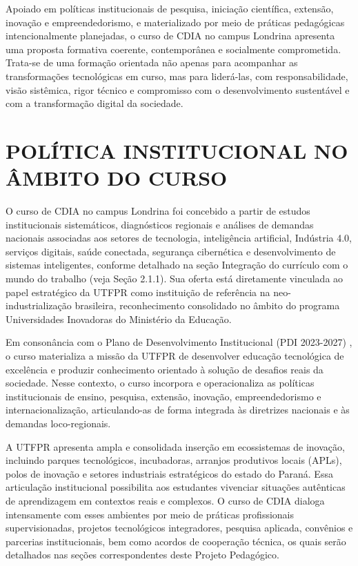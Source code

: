 Apoiado em políticas institucionais de pesquisa, iniciação científica, extensão, inovação e empreendedorismo, e materializado por meio de práticas pedagógicas intencionalmente planejadas, o curso de CDIA no campus Londrina apresenta uma proposta formativa coerente, contemporânea e socialmente comprometida. Trata-se de uma formação orientada não apenas para acompanhar as transformações tecnológicas em curso, mas para liderá-las, com responsabilidade, visão sistêmica, rigor técnico e compromisso com o desenvolvimento sustentável e com a transformação digital da sociedade.

\section{POLÍTICA INSTITUCIONAL NO ÂMBITO DO CURSO}

O curso de CDIA no campus Londrina foi concebido a partir de estudos institucionais sistemáticos, diagnósticos regionais e análises de demandas nacionais associadas aos setores de tecnologia, inteligência artificial, Indústria 4.0, serviços digitais, saúde conectada, segurança cibernética e desenvolvimento de sistemas inteligentes, conforme detalhado na seção Integração do currículo com o mundo do trabalho (veja Seção 2.1.1). Sua oferta está diretamente vinculada ao papel estratégico da UTFPR como instituição de referência na neo-industrialização brasileira, reconhecimento consolidado no âmbito do programa Universidades Inovadoras do Ministério da Educação.

Em consonância com o Plano de Desenvolvimento Institucional (PDI 2023-2027) \cite{UTFPR_PDI_2023}, o curso materializa a missão da UTFPR de desenvolver educação tecnológica de excelência e produzir conhecimento orientado à solução de desafios reais da sociedade. Nesse contexto, o curso incorpora e operacionaliza as políticas institucionais de ensino, pesquisa, extensão, inovação, empreendedorismo e internacionalização, articulando-as de forma integrada às diretrizes nacionais e às demandas loco-regionais.

A UTFPR apresenta ampla e consolidada inserção em ecossistemas de inovação, incluindo parques tecnológicos, incubadoras, arranjos produtivos locais (APLs), polos de inovação e setores industriais estratégicos do estado do Paraná. Essa articulação institucional possibilita aos estudantes vivenciar situações autênticas de aprendizagem em contextos reais e complexos. O curso de CDIA dialoga intensamente com esses ambientes por meio de práticas profissionais supervisionadas, projetos tecnológicos integradores, pesquisa aplicada, convênios e parcerias institucionais, bem como acordos de cooperação técnica, os quais serão detalhados nas seções correspondentes deste Projeto Pedagógico.

